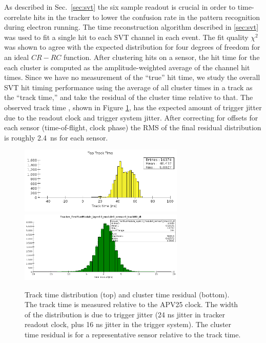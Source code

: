 



As described in Sec.~\ref{sec:svt} the six sample readout is crucial in order to time-correlate 
hits in the tracker to lower the confusion rate in the pattern recognition during electron running. 
The time reconstruction algorithm described in \ref{sec:svt} was used to fit a single hit to each SVT channel in each event. The fit quality $\chi^2$ was shown to agree with the expected distribution 
for four degrees of freedom for an ideal $CR-RC$ function. 
After clustering hits on a sensor, the hit time for the each cluster is computed as the 
amplitude-weighted average of the channel hit times. Since we have no measurement of the ``true'' hit time, we study the overall SVT hit 
timing performance using the average of all cluster times in a track as the ``track time,'' and take the
 residual of the cluster time relative to that. The observed track time , shown in Figure \ref{fig:tracktime}, has the expected amount of trigger jitter due to the readout clock and trigger 
 system jitter. After correcting for offsets for each sensor (time-of-flight, clock phase) the RMS 
 of the final residual distribution is roughly 2.4~ns for each sensor. 
\begin{figure}[h]
	\includegraphics[width=0.7\textwidth]{test2012/svtperformance/track_time_top}
	\includegraphics[width=0.7\textwidth]{test2012/svtperformance/timeres}
	\caption{\small{Track time distribution (top) and cluster time residual (bottom). The 
	track time is measured relative to the APV25 clock. The width of the distribution is due to 
	trigger jitter (24 ns jitter in tracker readout clock, plus 16 ns jitter in the trigger system). 
	The cluster time residual is for a representative sensor relative to the track time.}}
	\label{fig:tracktime}
\end{figure}
